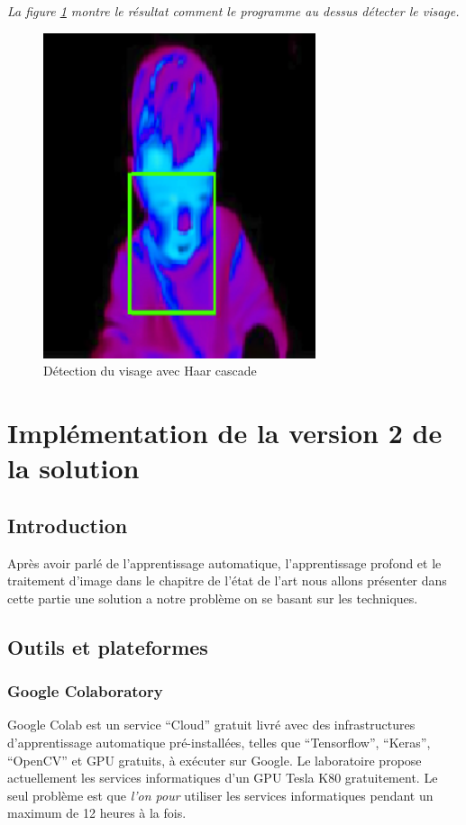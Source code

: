 \documentclass[12pt]{article}
\begin{document}
\textit{La figure \ref{fig:res} montre le résultat comment le programme au dessus détecter le visage.}
\begin{figure}[h]
	\centering
	\includegraphics[width=8cm]{img-Chapiter-4/enfant.png}
	\caption{Détection du visage avec Haar cascade}
	\label{fig:res}
\end{figure}

\newpage
\section{Implémentation de la version 2 de la solution}
\subsection{Introduction}
Après avoir parlé de l’apprentissage automatique, l’apprentissage profond et le traitement d’image dans le chapitre de l’état de l’art nous allons présenter dans cette partie une solution a notre problème on se basant sur les techniques.

\subsection{Outils et plateformes}
\subsubsection*{Google Colaboratory}
Google Colab est un service “Cloud” gratuit livré avec des infrastructures d’apprentissage automatique pré-installées, telles que “Tensorflow”, “Keras”, “OpenCV” et GPU gratuits, à exécuter sur Google. Le laboratoire propose actuellement les services informatiques d’un GPU Tesla K80 gratuitement. Le seul problème est que \textit{l'on pour} utiliser les services informatiques pendant un maximum de 12 heures à la fois. 
\end{document}
